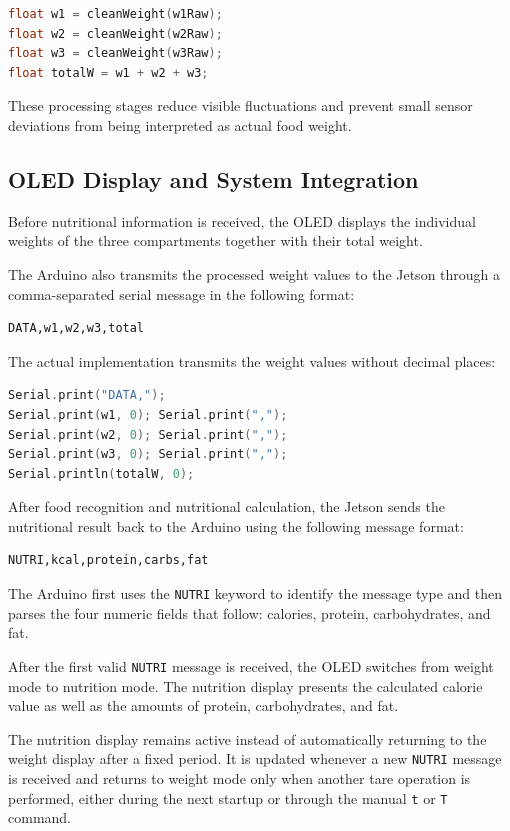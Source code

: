 \documentclass[11pt,a4paper]{article}
\begin{document}
\begin{lstlisting}[language=C]
float w1 = cleanWeight(w1Raw);
float w2 = cleanWeight(w2Raw);
float w3 = cleanWeight(w3Raw);
float totalW = w1 + w2 + w3;
\end{lstlisting}

These processing stages reduce visible fluctuations and prevent small sensor deviations from being interpreted as actual food weight.

\subsection{OLED Display and System Integration}

Before nutritional information is received, the OLED displays the individual weights of the three compartments together with their total weight.

The Arduino also transmits the processed weight values to the Jetson through a comma-separated serial message in the following format:

\begin{lstlisting}
DATA,w1,w2,w3,total
\end{lstlisting}

The actual implementation transmits the weight values without decimal places:

\begin{lstlisting}[language=C]
Serial.print("DATA,");
Serial.print(w1, 0); Serial.print(",");
Serial.print(w2, 0); Serial.print(",");
Serial.print(w3, 0); Serial.print(",");
Serial.println(totalW, 0);
\end{lstlisting}

After food recognition and nutritional calculation, the Jetson sends the nutritional result back to the Arduino using the following message format:

\begin{lstlisting}
NUTRI,kcal,protein,carbs,fat
\end{lstlisting}

The Arduino first uses the \texttt{NUTRI} keyword to identify the message type and then parses the four numeric fields that follow: calories, protein, carbohydrates, and fat.

After the first valid \texttt{NUTRI} message is received, the OLED switches from weight mode to nutrition mode. The nutrition display presents the calculated calorie value as well as the amounts of protein, carbohydrates, and fat.

The nutrition display remains active instead of automatically returning to the weight display after a fixed period. It is updated whenever a new \texttt{NUTRI} message is received and returns to weight mode only when another tare operation is performed, either during the next startup or through the manual \texttt{t} or \texttt{T} command.
\end{document}
